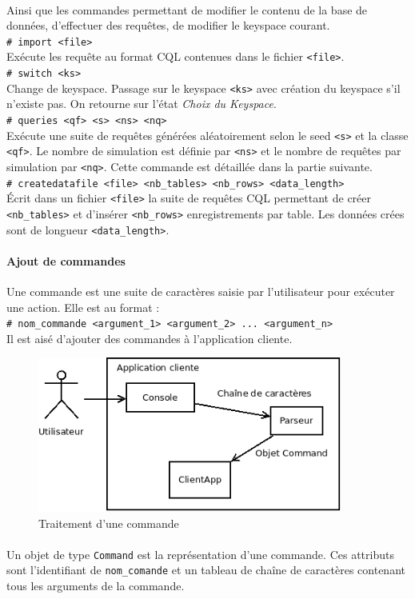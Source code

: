 \documentclass[12pt]{article}
\newcommand{\class}[1]{\texttt{#1}}
\newcommand{\shellcmd}[1]{\\\indent\indent\texttt{\footnotesize\# #1}\\}
\begin{document}
\paragraph{} Ainsi que les commandes permettant de modifier le contenu de la base de données, d'effectuer des requêtes, de modifier le keyspace courant.
\newline
\shellcmd{import <file>}
Exécute les requête au format CQL contenues dans le fichier \texttt{<file>}.
\shellcmd{switch <ks>}
Change de keyspace. Passage sur le keyspace \texttt{<ks>} avec création du keyspace s'il n'existe pas. On retourne sur l'état \textit{Choix du Keyspace}.
\shellcmd{queries <qf> <s> <ns> <nq>}
Exécute une suite de requêtes générées aléatoirement selon le seed \texttt{<s>} et la classe \texttt{<qf>}. Le nombre de simulation est définie par \texttt{<ns>} et le nombre de requêtes par simulation par \texttt{<nq>}. Cette commande est détaillée dans la partie suivante.
\shellcmd{createdatafile  <file> <nb\_tables> <nb\_rows> <data\_length>}
Écrit dans un fichier \texttt{<file>} la suite de requêtes CQL permettant de créer \texttt{<nb\_tables>} et d'insérer \texttt{<nb\_rows>} enregistrements par table. Les données crées sont de longueur \texttt{<data\_length>}.
 
\paragraph{Ajout de commandes} Une commande est une suite de caractères saisie par l'utilisateur pour exécuter une action. Elle est au format :
\shellcmd{nom\_commande <argument\_1> <argument\_2> ... <argument\_n> }
Il est aisé d'ajouter des commandes à l'application cliente.

\begin{figure}[h]
	\centering
		\includegraphics[width=10cm]{images/client/command.png}
	\caption{Traitement d'une commande \label{fig:commande}}
\end{figure}

\paragraph{} Un objet de type \class{Command} est la représentation d'une commande. 
Ces attributs sont l'identifiant de \texttt{nom\_comande} et un tableau de chaîne de caractères contenant tous les arguments de la commande.
\end{document}
